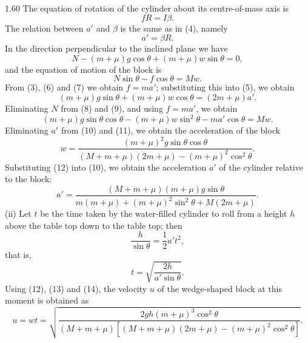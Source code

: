 \begin{solution}{1.60}
The equation of rotation of the cylinder about its centre-of-mass axis is
\begin{equation}
fR=I\beta. \tag{6}
\end{equation}
The relation between $a'$ and $\beta$ is the same as in (4), namely
\begin{equation}
a'=\beta R. \tag{7}
\end{equation}
In the direction perpendicular to the inclined plane we have
\begin{equation}
N-(m+\mu)g\cos\theta+(m+\mu)w\sin\theta=0, \tag{8}
\end{equation}
and the equation of motion of the block is
\begin{equation}
N\sin\theta-f\cos\theta=Mw. \tag{9}
\end{equation}
From (3), (6) and (7) we obtain $f=ma'$; substituting this into (5), we obtain
\begin{equation}
(m+\mu)g\sin\theta+(m+\mu)w\cos\theta=(2m+\mu)a'. \tag{10}
\end{equation}
Eliminating $N$ from (8) and (9), and using $f=ma'$, we obtain
\begin{equation}
(m+\mu)g\sin\theta\cos\theta-(m+\mu)w\sin^2\theta-ma'\cos\theta=Mw. \tag{11}
\end{equation}
Eliminating $a'$ from (10) and (11), we obtain the acceleration of the block
\begin{equation}
w=\frac{(m+\mu)^2g\sin\theta\cos\theta}{(M+m+\mu)(2m+\mu)-(m+\mu)^2\cos^2\theta}. \tag{12}
\end{equation}
Substituting (12) into (10), we obtain the acceleration $a'$ of the cylinder relative to the block:
\begin{equation}
a'=\frac{(M+m+\mu)(m+\mu)g\sin\theta}{m(m+\mu)+(m+\mu)^2\sin^2\theta+M(2m+\mu)}. \tag{13}
\end{equation}
(ii) Let $t$ be the time taken by the water-filled cylinder to roll from a height $h$ above the table top down to the table top; then
\[
\frac{h}{\sin\theta}=\frac{1}{2}a't^2,
\]
that is,
\begin{equation}
t=\sqrt{\frac{2h}{a'\sin\theta}}. \tag{14}
\end{equation}
Using (12), (13) and (14), the velocity $u$ of the wedge-shaped block at this moment is obtained as
\[
u=wt=\sqrt{\frac{2gh(m+\mu)^3\cos^2\theta}{(M+m+\mu)\left[(M+m+\mu)(2m+\mu)-(m+\mu)^2\cos^2\theta\right]}}.
\]
\end{solution}

